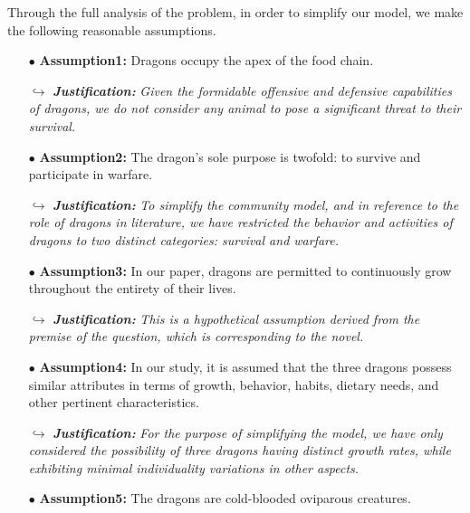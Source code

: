 \documentclass[12pt]{article}  %
\begin{document}
Through the full analysis of the problem, in order to simplify our model, we make the following reasonable assumptions.
\begin{itemize}
\item[$\bullet$] \textbf{Assumption1:} Dragons occupy the apex of the food chain.

\vspace{-0.2cm}
\item[$\hookrightarrow $]\textit{\textbf{Justification:}} \textit{Given the formidable offensive and defensive capabilities of dragons, we do not consider any animal to pose a significant threat to their survival.}

\item[$\bullet$] \textbf{Assumption2:} The dragon's sole purpose is twofold: to survive and participate in warfare.

\vspace{-0.2cm}
\item[$\hookrightarrow $]\textit{\textbf{Justification:}} \textit{To simplify the community model, and in reference to the role of dragons in literature, we have restricted the behavior and activities of dragons to two distinct categories: survival and warfare.}

\item[$\bullet$] \textbf{Assumption3:} In our paper, dragons are permitted to continuously grow throughout the entirety of their lives.

\vspace{-0.2cm}
\item[$\hookrightarrow $]\textit{\textbf{Justification:}} \textit{This is a hypothetical assumption derived from the premise of the question, which is corresponding to the novel.}

\item[$\bullet$] \textbf{Assumption4:} In our study, it is assumed that the three dragons possess similar attributes in terms of growth, behavior, habits, dietary needs, and other pertinent characteristics.

\vspace{-0.2cm}
\item[$\hookrightarrow $]\textit{\textbf{Justification:}} \textit{For the purpose of simplifying the model, we have only considered the possibility of three dragons having distinct growth rates, while exhibiting minimal individuality variations in other aspects.}

\item[$\bullet$] \textbf{Assumption5:} The dragons are cold-blooded oviparous creatures.


\end{itemize}
\end{document}
